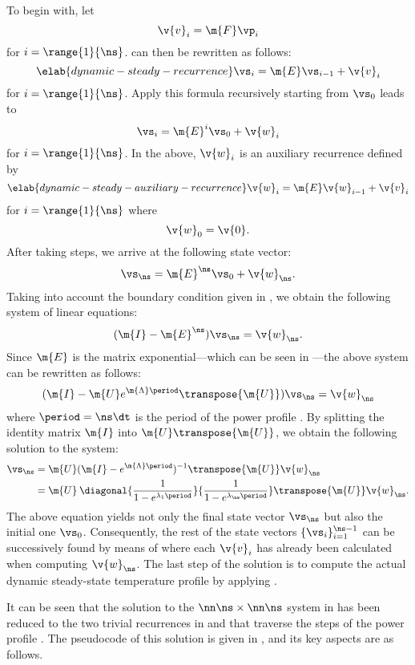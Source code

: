 To begin with, let
\[
  \v{v}_i = \m{F} \vp_i
\]
for $i = \range{1}{\ns}$.  can then be rewritten as
follows:
\begin{equation} \elab{dynamic-steady-recurrence}
  \vs_i = \m{E} \vs_{i - 1} + \v{v}_i
\end{equation}
for $i = \range{1}{\ns}$. Apply this formula recursively starting from $\vs_0$
leads to
\[
  \vs_i = \m{E}^i \vs_0 + \v{w}_i
\]
for $i = \range{1}{\ns}$. In the above, $\v{w}_i$ is an auxiliary recurrence
defined by
\begin{equation} \elab{dynamic-steady-auxiliary-recurrence}
  \v{w}_i = \m{E} \v{w}_{i - 1} + \v{v}_i
\end{equation}
for $i = \range{1}{\ns}$ where
\[
  \v{w}_0 = \v{0}.
\]
After taking \ns steps, we arrive at the following state vector:
\[
  \vs_\ns = \m{E}^\ns \vs_0 + \v{w}_\ns.
\]
Taking into account the boundary condition given in
, we obtain the following system of linear
equations:
\[
  (\m{I} - \m{E}^\ns) \vs_\ns = \v{w}_\ns.
\]
Since $\m{E}$ is the matrix exponential---which can be seen in
---the above system can be rewritten as follows:
\[
  (\m{I} - \m{U} e^{\m{\Lambda} \period} \transpose{\m{U}}) \vs_\ns = \v{w}_\ns
\]
where $\period = \ns \dt$ is the period of the power profile \mp. By splitting
the identity matrix $\m{I}$ into $\m{U} \transpose{\m{U}}$, we obtain the
following solution to the system:
\begin{align*}
  \vs_\ns
  & = \m{U} (\m{I} - e^{\m{\Lambda} \period})^{-1} \transpose{\m{U}} \v{w}_\ns \\
  & = \m{U} \: \diagonal{\frac{1}{1 - e^{\lambda_1 \period}}}{\frac{1}{1 - e^{\lambda_\ns \period}}} \transpose{\m{U}} \v{w}_\ns.
\end{align*}
The above equation yields not only the final state vector $\vs_\ns$ but also the
initial one $\vs_0$. Consequently, the rest of the state vectors $\{ \vs_i \}_{i
= 1}^{\ns - 1}$ can be successively found by means of
 where each $\v{v}_i$ has already been
calculated when computing $\v{w}_\ns$. The last step of the solution is to
compute the actual dynamic steady-state temperature profile \mq by applying
.

It can be seen that the solution to the $\nn \ns \times \nn \ns$ system in
 has been reduced to the two trivial recurrences in
 and 
that traverse the \ns steps of the power profile \mp. The pseudocode of this
solution is given in , and its key aspects
are as follows.

